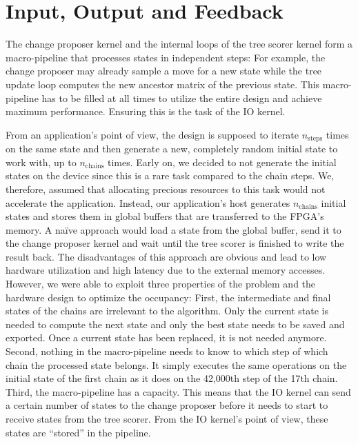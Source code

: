 \section{Input, Output and Feedback}
\label{sec:io}

The change proposer kernel and the internal loops of the tree scorer kernel form a macro-pipeline that processes states in independent steps: For example, the change proposer may already sample a move for a new state while the tree update loop computes the new ancestor matrix of the previous state. This macro-pipeline has to be filled at all times to utilize the entire design and achieve maximum performance. Ensuring this is the task of the IO kernel.

From an application's point of view, the design is supposed to iterate $n_\mathrm{steps}$ times on the same state and then generate a new, completely random initial state to work with, up to $n_\mathrm{chains}$ times. Early on, we decided to not generate the initial states on the device since this is a rare task compared to the chain steps. We, therefore, assumed that allocating precious resources to this task would not accelerate the application. Instead, our application's host generates $n_\mathrm{chains}$ initial states and stores them in global buffers that are transferred to the \ac{FPGA}'s memory. A na\"ive approach would load a state from the global buffer, send it to the change proposer kernel and wait until the tree scorer is finished to write the result back. The disadvantages of this approach are obvious and lead to low hardware utilization and high latency due to the external memory accesses. However, we were able to exploit three properties of the problem and the hardware design to optimize the occupancy: First, the intermediate and final states of the chains are irrelevant to the algorithm. Only the current state is needed to compute the next state and only the best state needs to be saved and exported. Once a current state has been replaced, it is not needed anymore. Second, nothing in the macro-pipeline needs to know to which step of which chain the processed state belongs. It simply executes the same operations on the initial state of the first chain as it does on the 42,000th step of the 17th chain. Third, the macro-pipeline has a capacity. This means that the IO kernel can send a certain number of states to the change proposer before it needs to start to receive states from the tree scorer. From the IO kernel's point of view, these states are ``stored'' in the pipeline.

